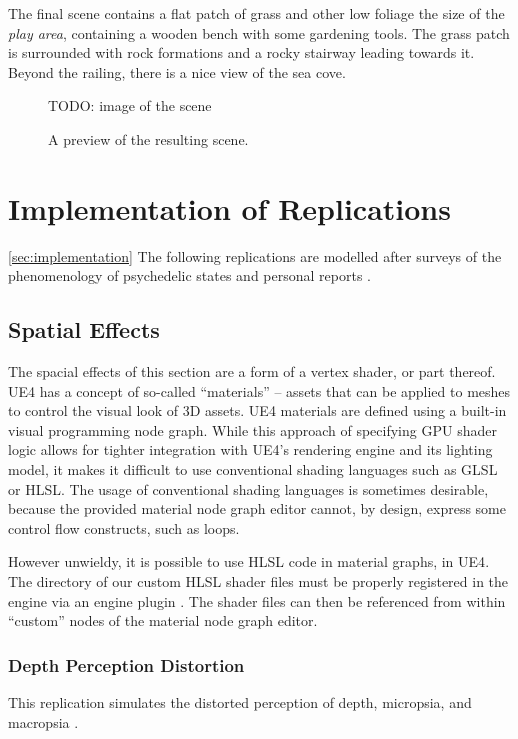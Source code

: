 The final scene contains a flat patch of grass and other low foliage the size of the \textit{play area}, containing a wooden bench with some gardening tools. The grass patch is surrounded with rock formations and a rocky stairway leading towards it. Beyond the railing, there is a nice view of the sea cove.

\begin{figure}[H]
    \centering
    \ifgraphics
        TODO: image of the scene
    \fi
    \caption{A preview of the resulting scene.}\label{fig:scene-preview}
\end{figure}

\section{Implementation of Replications}\ref{sec:implementation}
The following replications are modelled after surveys of the phenomenology of psychedelic states \autocites{preller2016phenomenology}{kometer2016serotonergic} and personal reports \autocite{kleinman1977comparison}.

\subsection{Spatial Effects}
The spacial effects of this section are a form of a vertex shader, or part thereof. \ac{UE4} has a concept of so-called ``materials'' -- assets that can be applied to meshes to control the visual look of 3D assets. \ac{UE4} materials are defined using a built-in visual programming node graph. While this approach of specifying \ac{GPU} shader logic allows for tighter integration with \ac{UE4}'s rendering engine and its lighting model, it makes it difficult to use conventional shading languages such as \ac{GLSL} or \ac{HLSL}. The usage of conventional shading languages is sometimes desirable, because the provided material node graph editor cannot, by design, express some control flow constructs, such as loops.

However unwieldy, it is possible to use \ac{HLSL} code in material graphs, in \ac{UE4}. The directory of our custom \ac{HLSL} shader files must be properly registered in the engine via an engine plugin \autocite{synthenz2021shaderdir}. The shader files can then be referenced from within ``custom'' nodes of the material node graph editor.

\subsubsection{Depth Perception Distortion}
This replication simulates the distorted perception of depth, micropsia, and macropsia \autocites{fischer1970psilocybin}{dittrich1998standardized}{hill1969effects}{hill1973induction}.

